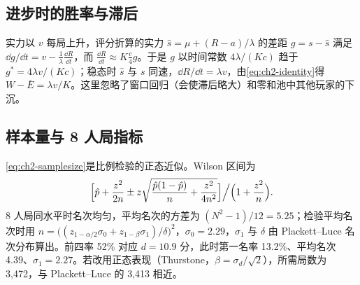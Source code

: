 \subsection{进步时的胜率与滞后}
\label{app:ch2-improve}

实力以 $v$ 每局上升，评分折算的实力 $\hat s=\mu+(R-a)/\lambda$ 的差距 $g=s-\hat s$ 满足 $\dd g/\dd t=v-\frac{1}{\lambda}\frac{\dd R}{\dd t}$，而 $\frac{\dd R}{\dd t}\approx K\frac c4g$。于是 $g$ 以时间常数 $4\lambda/(Kc)$ 趋于 $g^*=4\lambda v/(Kc)$；稳态时 $\hat s$ 与 $s$ 同速，$\dd R/\dd t=\lambda v$，由\cref{eq:ch2-identity}得 $W-\bar E=\lambda v/K$。这里忽略了窗口回归（会使滞后略大）和零和池中其他玩家的下沉。

\subsection{样本量与 8 人局指标}
\label{app:ch2-sample}

\cref{eq:ch2-samplesize}是比例检验的正态近似。Wilson 区间为
\[
  \Bigl[\hat p+\frac{z^2}{2n}\pm z\sqrt{\frac{\hat p(1-\hat p)}{n}+\frac{z^2}{4n^2}}\Bigr]\Big/\Bigl(1+\frac{z^2}{n}\Bigr).
\]
8 人局同水平时名次均匀，平均名次的方差为 $(N^2-1)/12=5.25$；检验平均名次时用 $n=\bigl((z_{1-\alpha/2}\sigma_0+z_{1-\beta}\sigma_1)/\delta\bigr)^2$，$\sigma_0=2.29$，$\sigma_1$ 与 $\delta$ 由 Plackett–Luce 名次分布算出。前四率 52\% 对应 $d=10.9$ 分，此时第一名率 13.2\%、平均名次 4.39、$\sigma_1=2.27$。若改用正态表现（Thurstone，$\beta=\sigma_d/\sqrt2$），所需局数为 3,472，与 Plackett–Luce 的 3,413 相近\tagOwn。
